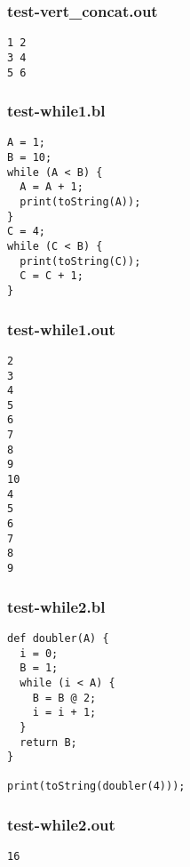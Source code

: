 \subsubsection{test-vert\_concat.out}
\begin{lstlisting}
1 2
3 4
5 6\end{lstlisting}
\subsubsection{test-while1.bl}
\begin{lstlisting}
A = 1;
B = 10;
while (A < B) {
  A = A + 1;
  print(toString(A));
}
C = 4;
while (C < B) {
  print(toString(C));
  C = C + 1;
}
\end{lstlisting}
\subsubsection{test-while1.out}
\begin{lstlisting}
2
3
4
5
6
7
8
9
10
4
5
6
7
8
9\end{lstlisting}
\subsubsection{test-while2.bl}
\begin{lstlisting}
def doubler(A) {
  i = 0;
  B = 1;
  while (i < A) {
    B = B @ 2;
    i = i + 1;
  }
  return B;
}

print(toString(doubler(4)));\end{lstlisting}
\subsubsection{test-while2.out}
\begin{lstlisting}
16\end{lstlisting}

